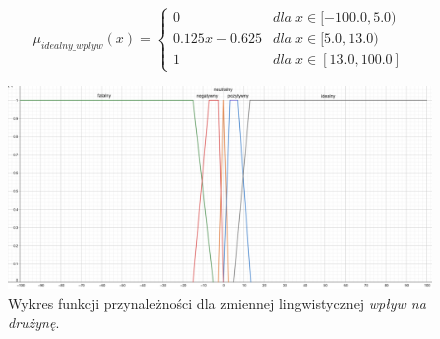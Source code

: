 \documentclass{classrep}
\begin{document}
\begin{enumerate}
\begin{itemize}
        \begin{equation}
            \mu_{idealny\_wplyw}(x) = \left\{\begin{matrix} 0 & dla \: x\in [-100.0, 5.0) \\ 0.125x - 0.625 & dla \: x\in[5.0, 13.0) \\ 1 & dla \: x\in [13.0, 100.0] \end{matrix}\right.
        \end{equation}
    \end{itemize}
    \begin{figure}[H]
        \centering
        \includegraphics[width=14cm]{wykres_wplyw.png}
        \caption{Wykres funkcji przynależności dla zmiennej lingwistycznej \textit{wpływ na drużynę}.}
        \label{rysunek:wplyw}
    \end{figure}
    

\end{enumerate}
\end{document}

